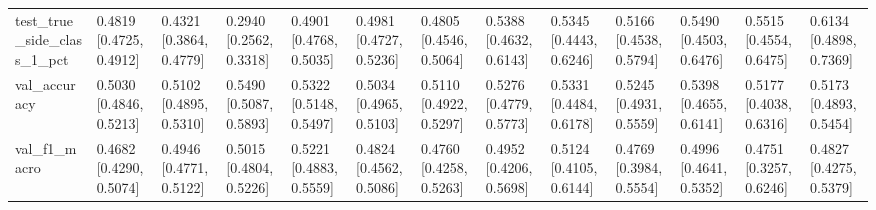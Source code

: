 \begin{tabular}{lllllllllllll}
test\_true\_side\_class\_1\_pct & 0.4819 [0.4725, 0.4912] & 0.4321 [0.3864, 0.4779] & 0.2940 [0.2562, 0.3318] & 0.4901 [0.4768, 0.5035] & 0.4981 [0.4727, 0.5236] & 0.4805 [0.4546, 0.5064] & 0.5388 [0.4632, 0.6143] & 0.5345 [0.4443, 0.6246] & 0.5166 [0.4538, 0.5794] & 0.5490 [0.4503, 0.6476] & 0.5515 [0.4554, 0.6475] & 0.6134 [0.4898, 0.7369] \\
val\_accuracy & 0.5030 [0.4846, 0.5213] & 0.5102 [0.4895, 0.5310] & 0.5490 [0.5087, 0.5893] & 0.5322 [0.5148, 0.5497] & 0.5034 [0.4965, 0.5103] & 0.5110 [0.4922, 0.5297] & 0.5276 [0.4779, 0.5773] & 0.5331 [0.4484, 0.6178] & 0.5245 [0.4931, 0.5559] & 0.5398 [0.4655, 0.6141] & 0.5177 [0.4038, 0.6316] & 0.5173 [0.4893, 0.5454] \\
val\_f1\_macro & 0.4682 [0.4290, 0.5074] & 0.4946 [0.4771, 0.5122] & 0.5015 [0.4804, 0.5226] & 0.5221 [0.4883, 0.5559] & 0.4824 [0.4562, 0.5086] & 0.4760 [0.4258, 0.5263] & 0.4952 [0.4206, 0.5698] & 0.5124 [0.4105, 0.6144] & 0.4769 [0.3984, 0.5554] & 0.4996 [0.4641, 0.5352] & 0.4751 [0.3257, 0.6246] & 0.4827 [0.4275, 0.5379] \\
\bottomrule
\end{tabular}
